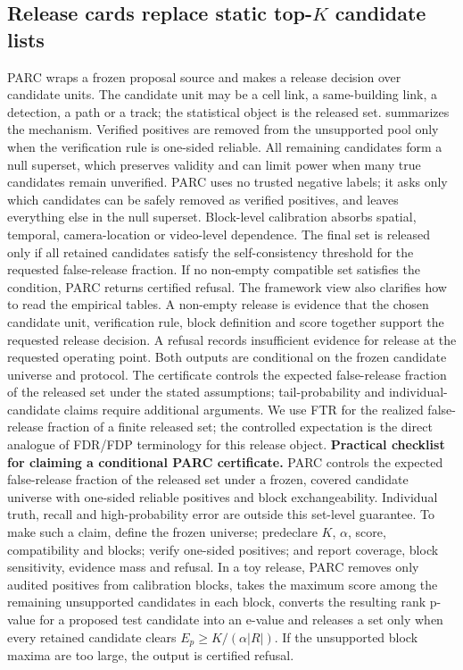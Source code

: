 \documentclass[10pt,twocolumn]{article}
\begin{document}
\subsection{Release cards replace static top-\(K\) candidate lists}

PARC wraps a frozen proposal source and makes a release decision over candidate units.
The candidate unit may be a cell link, a same-building link, a detection, a path or a track; the statistical object is the released set.
 summarizes the mechanism.
Verified positives are removed from the unsupported pool only when the verification rule is one-sided reliable.
All remaining candidates form a null superset, which preserves validity and can limit power when many true candidates remain unverified.
PARC uses no trusted negative labels; it asks only which candidates can be safely removed as verified positives, and leaves everything else in the null superset.
Block-level calibration absorbs spatial, temporal, camera-location or video-level dependence.
The final set is released only if all retained candidates satisfy the self-consistency threshold for the requested false-release fraction.
If no non-empty compatible set satisfies the condition, PARC returns certified refusal.
The framework view also clarifies how to read the empirical tables.
A non-empty release is evidence that the chosen candidate unit, verification rule, block definition and score together support the requested release decision.
A refusal records insufficient evidence for release at the requested operating point.
Both outputs are conditional on the frozen candidate universe and protocol.
The certificate controls the expected false-release fraction of the released set under the stated assumptions; tail-probability and individual-candidate claims require additional arguments.
We use FTR for the realized false-release fraction of a finite released set; the controlled expectation is the direct analogue of FDR/FDP terminology for this release object.
\textbf{Practical checklist for claiming a conditional PARC certificate.}
PARC controls the expected false-release fraction of the released set under a frozen, covered candidate universe with one-sided reliable positives and block exchangeability.
Individual truth, recall and high-probability error are outside this set-level guarantee.
To make such a claim, define the frozen universe; predeclare \(K\), \(\alpha\), score, compatibility and blocks; verify one-sided positives; and report coverage, block sensitivity, evidence mass and refusal.
In a toy release, PARC removes only audited positives from calibration blocks, takes the maximum score among the remaining unsupported candidates in each block, converts the resulting rank p-value for a proposed test candidate into an e-value and releases a set only when every retained candidate clears \(E_p\ge K/(\alpha|R|)\).
If the unsupported block maxima are too large, the output is certified refusal.
\end{document}
